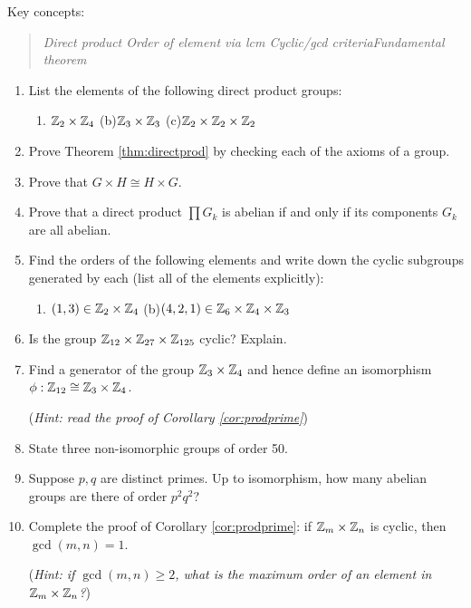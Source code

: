 \begin{exercises}
Key concepts:
\begin{quote}
	\emph{Direct product \qquad Order of element via lcm \qquad Cyclic/gcd criteria\qquad Fundamental theorem}
\end{quote}

\begin{enumerate}
	\item List the elements of the following direct product groups:
	\begin{enumerate}
  	\item $\mathbb{Z}_2\times\mathbb{Z}_4$\qquad\qquad
  	(b)\lstsp $\mathbb{Z}_3\times\mathbb{Z}_3$\qquad\qquad
  	(c)\lstsp $\mathbb{Z}_2\times\mathbb{Z}_2\times\mathbb{Z}_2$
	\end{enumerate}
	
  \item Prove Theorem \ref{thm:directprod} by checking each of the axioms of a group.

	\item Prove that $G\times H\cong H\times G$.
	
	\item Prove that a direct product $\prod G_k$ is abelian if and only if its components $G_k$ are all abelian.
	
	\item Find the orders of the following elements and write down the cyclic subgroups generated by each (list all of the elements explicitly):
	\begin{enumerate}
  	\item $(1,3)\in\mathbb{Z}_2\times\mathbb{Z}_4$\qquad\qquad
  	(b)\lstsp $(4,2,1)\in\mathbb{Z}_6\times\mathbb{Z}_4\times\mathbb{Z}_3$
	\end{enumerate}
	
	\item Is the group $\mathbb{Z}_{12}\times \mathbb{Z}_{27}\times\mathbb{Z}_{125}$ cyclic? Explain.

	\item Find a generator of the group $\mathbb{Z}_3\times\mathbb{Z}_4$ and hence define an isomorphism $\phi:\mathbb{Z}_{12}\cong\mathbb{Z}_3\times\mathbb{Z}_4$.\par
	(\emph{Hint: read the proof of Corollary \ref{cor:prodprime}})


	\item State three non-isomorphic groups of order 50.
	
	\item Suppose $p,q$ are distinct primes. Up to isomorphism, how many abelian groups are there of order $p^2q^2$?
	
	\item\label{exs:corprodprime} Complete the proof of Corollary \ref{cor:prodprime}: if $\mathbb{Z}_m\times\mathbb{Z}_n$ is cyclic, then $\gcd(m,n)=1$.\par
	(\emph{Hint: if $\gcd(m,n)\ge 2$, what is the maximum order of an element in $\mathbb{Z}_m\times\mathbb{Z}_n$?})


\end{enumerate}
\end{exercises}

